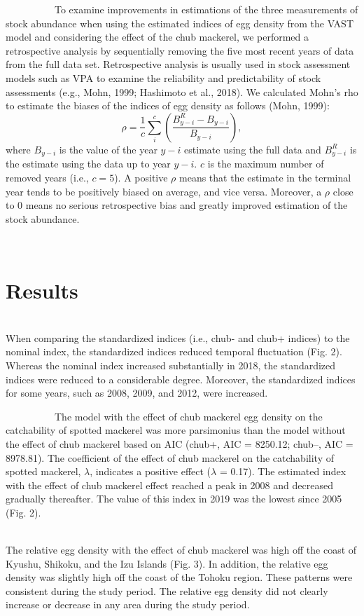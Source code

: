 \documentclass[12pt]{article}
\begin{document}
\begin{linenumbers}
\ \ \ \ \ \ \ \ \ \
To examine improvements in estimations of the three measurements of stock abundance when using the estimated indices of egg density from the VAST model and considering the effect of the chub mackerel, we performed a retrospective analysis by sequentially removing the five most recent years of data from the full data set. Retrospective analysis is usually used in stock assessment models such as VPA to examine the reliability and predictability of stock assessments (e.g., Mohn, 1999; Hashimoto et al., 2018). We calculated Mohn's rho to estimate the biases of the indices of egg density as follows (Mohn, 1999):
\[\rho = \frac{1}{c} \sum_{i}^{c} \left(\frac{B_{y-i}^R - B_{y-i}} {B_{y-i}} \right)
,\]
where $B_{y-i}$ is the value of the year $y-i$ estimate using the full data and $B_{y-i}^R$ is the estimate using the data up to year $y-i$. $c$ is the maximum number of removed years (i.e., $c = 5$). A positive $\rho$ means that the estimate in the terminal year tends to be positively biased on average, and vice versa. Moreover, a $\rho$ close to $0$ means no serious retrospective bias and greatly improved estimation of the stock abundance.

\ \\
\section{Results}
\\
When comparing the standardized indices (i.e., chub- and chub+ indices) to the nominal index, the standardized indices reduced temporal fluctuation (Fig. 2). Whereas the nominal index increased substantially in 2018, the standardized indices were reduced to a considerable degree. Moreover, the standardized indices for some years, such as 2008, 2009, and 2012, were increased.

\ \ \ \ \ \ \ \ \ \
The model with the effect of chub mackerel egg density on the catchability of spotted mackerel was more parsimonius than the model without the effect of chub mackerel based on AIC (chub+, AIC = 8250.12; chub--, AIC = 8978.81). The coefficient of the effect of chub mackerel on the catchability of spotted mackerel, $\lambda$, indicates a positive effect ($\lambda$ = 0.17). The estimated index with the effect of chub mackerel effect reached a peak in 2008 and decreased gradually thereafter. The value of this index in 2019 was the lowest since 2005 (Fig. 2).

\flushleft{\textbf{3.2 Spatial distribution of the relative egg density}}\\
The relative egg density with the effect of chub mackerel was high off the coast of Kyushu, Shikoku, and the Izu Islands (Fig. 3). In addition, the relative egg density was slightly high off the coast of the Tohoku region. These patterns were consistent during the study period. The relative egg density did not clearly increase or decrease in any area during the study period.


\end{linenumbers}
\end{document}
